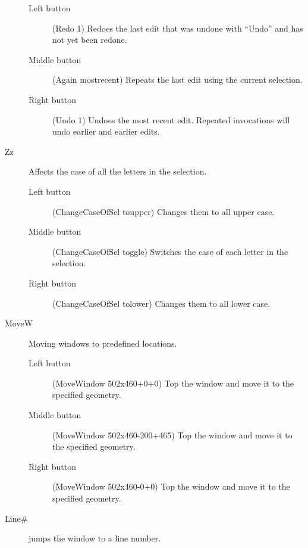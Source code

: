 \begin{description}
\begin{description}
	\item[Left button] (Redo 1) Redoes the last edit that was
		undone with ``Undo'' and has not yet been redone.

	\item[Middle button] (Again mostrecent) Repeats the last edit using
		the current selection.

	\item[Right button] (Undo 1) Undoes the most recent edit.
		Repeated invocations will undo earlier and earlier
		edits.

	\end{description}

\item[Zz] Affects the case of all the letters in the selection.

	\begin{description}

	\item[Left button] (ChangeCaseOfSel toupper) Changes them to all
		upper case.

	\item[Middle button] (ChangeCaseOfSel toggle) Switches the case
		of each letter in the selection.

	\item[Right button] (ChangeCaseOfSel tolower) Changes them to all
		lower case.

	\end{description}

\item[MoveW] Moving windows to predefined locations.

	\begin{description}

	\item[Left button] (MoveWindow 502x460+0+0)
		Top the window and move it to the specified geometry.

	\item[Middle button] (MoveWindow 502x460-200+465)
		Top the window and move it to the specified geometry.

	\item[Right button] (MoveWindow 502x460-0+0)
		Top the window and move it to the specified geometry.

	\end{description}

\item[Line\#] jumps the window to a line number.

	\begin{description}


\end{description}
\end{description}
